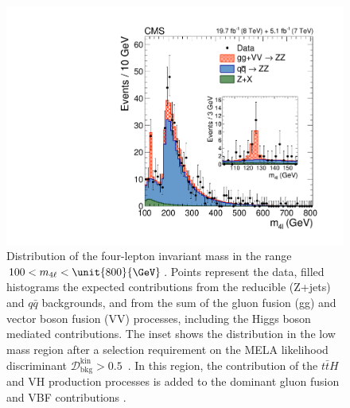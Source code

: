 \begin{figure}
\centering
\includegraphics[width=\linewidth]{HZZ_Width/fig2_new.pdf}
\caption[Distribution of the four-lepton invariant mass in the range $100 < m_{4\ell} < \unit{800}{\GeV}$.
Points represent the data, filled histograms the expected contributions from the reducible
(Z+jets) and $q\bar{q}$ backgrounds, and from the sum of the gluon fusion (gg) and
vector boson fusion (VV) processes, including the Higgs boson mediated contributions.
The inset shows the distribution in the low mass region after a selection requirement
on the MELA likelihood discriminant $\mathcal{D}_\text{bkg}^\text{kin} > 0.5$.
In this region, the contribution of the $t\bar{t}H$ and VH production processes is added to
the dominant gluon fusion and VBF contributions.]{
Distribution of the four-lepton invariant mass in the range $100 < m_{4\ell} < \unit{800}{\GeV}$.
Points represent the data, filled histograms the expected contributions from the reducible
(Z+jets) and $q\bar{q}$ backgrounds, and from the sum of the gluon fusion (gg) and
vector boson fusion (VV) processes, including the Higgs boson mediated contributions.
The inset shows the distribution in the low mass region after a selection requirement
on the MELA likelihood discriminant $\mathcal{D}_\text{bkg}^\text{kin} > 0.5$~\cite{Chatrchyan:2013mxa}.
In this region, the contribution of the $t\bar{t}H$ and VH production processes is added to
the dominant gluon fusion and VBF contributions \cite{Khachatryan:2014iha}.
}
\label{fig:massfull}
\end{figure}

